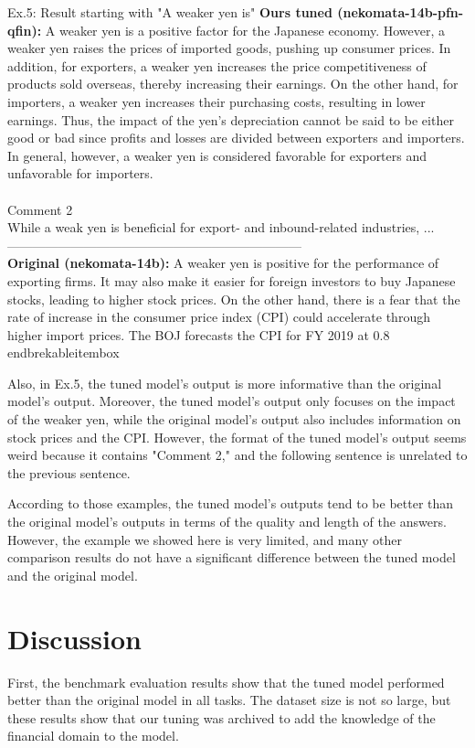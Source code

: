 \begin{brekableitembox}{Ex.5: Result starting with "A weaker yen is"}
    {\bf Ours tuned (nekomata-14b-pfn-qfin):}
    A weaker yen is a positive factor for the Japanese economy. However, a weaker yen raises the prices of imported goods, pushing up consumer prices. In addition, for exporters, a weaker yen increases the price competitiveness of products sold overseas, thereby increasing their earnings. On the other hand, for importers, a weaker yen increases their purchasing costs, resulting in lower earnings.
    Thus, the impact of the yen's depreciation cannot be said to be either good or bad since profits and losses are divided between exporters and importers. In general, however, a weaker yen is considered favorable for exporters and unfavorable for importers.\\
    \\
    Comment 2\\
    While a weak yen is beneficial for export- and inbound-related industries, ...\\
    ---------------------------------------------------------------------\\
    {\bf Original (nekomata-14b):}
    A weaker yen is positive for the performance of exporting firms. It may also make it easier for foreign investors to buy Japanese stocks, leading to higher stock prices.
    On the other hand, there is a fear that the rate of increase in the consumer price index (CPI) could accelerate through higher import prices. The BOJ forecasts the CPI for FY 2019 at 0.8\\end{brekableitembox}

Also, in Ex.5, the tuned model's output is more informative than the original model's output.
Moreover, the tuned model's output only focuses on the impact of the weaker yen, while the original model's output also includes information on stock prices and the CPI.
However, the format of the tuned model's output seems weird because it contains "Comment 2," and the following sentence is unrelated to the previous sentence.

According to those examples, the tuned model's outputs tend to be better than the original model's outputs in terms of the quality and length of the answers.
However, the example we showed here is very limited, and many other comparison results do not have a significant difference between the tuned model and the original model.

\section{Discussion}
First, the benchmark evaluation results show that the tuned model performed better than the original model in all tasks.
The dataset size is not so large, but these results show that our tuning was archived to add the knowledge of the financial domain to the model.


\end{brekableitembox}
